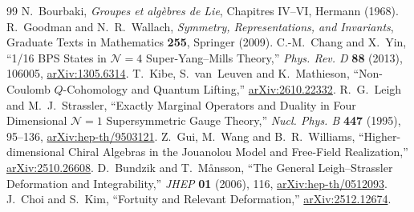 \documentclass[11pt]{article}
\numberwithin{equation}{section}
\numberwithin{figure}{section}
\numberwithin{table}{section}
\begin{document}
\begin{thebibliography}{99}
N.~Bourbaki, \emph{Groupes et alg\`ebres de Lie}, Chapitres IV--VI, Hermann (1968).
R.~Goodman and N.~R.~Wallach, \emph{Symmetry, Representations, and Invariants}, Graduate Texts in Mathematics \textbf{255}, Springer (2009).
C.-M.~Chang and X.~Yin, ``1/16 BPS States in $\mathcal N=4$ Super-Yang--Mills Theory,'' \emph{Phys. Rev. D} \textbf{88} (2013), 106005, \href{https://arxiv.org/abs/1305.6314}{arXiv:1305.6314}.
T.~Kibe, S.~van~Leuven and K.~Mathieson, ``Non-Coulomb $Q$-Cohomology and Quantum Lifting,'' \href{https://arxiv.org/abs/2610.22332}{arXiv:2610.22332}.
R.~G.~Leigh and M.~J.~Strassler, ``Exactly Marginal Operators and Duality in Four Dimensional $\mathcal N=1$ Supersymmetric Gauge Theory,'' \emph{Nucl. Phys. B} \textbf{447} (1995), 95--136, \href{https://arxiv.org/abs/hep-th/9503121}{arXiv:hep-th/9503121}.
Z.~Gui, M.~Wang and B.~R.~Williams, ``Higher-dimensional Chiral Algebras in the Jouanolou Model and Free-Field Realization,'' \href{https://arxiv.org/abs/2510.26608}{arXiv:2510.26608}.
D.~Bundzik and T.~M{\aa}nsson, ``The General Leigh--Strassler Deformation and Integrability,'' \emph{JHEP} \textbf{01} (2006), 116, \href{https://arxiv.org/abs/hep-th/0512093}{arXiv:hep-th/0512093}.
J.~Choi and S.~Kim, ``Fortuity and Relevant Deformation,'' \href{https://arxiv.org/abs/2512.12674}{arXiv:2512.12674}.
\end{thebibliography}
\end{document}
